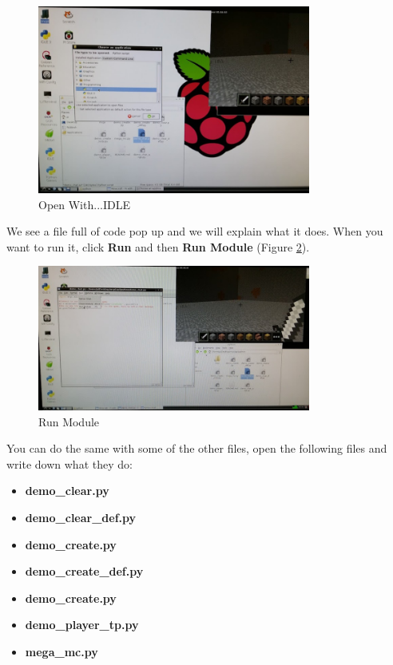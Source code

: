 \documentclass[]{paper}
\begin{document}
\begin{figure}[H]
    \centering
    \includegraphics[width=0.8\textwidth]{figures/idle.jpg}
    \caption{Open With...IDLE}
    \label{fig:idle}
\end{figure}


We see a file full of code pop up and we will explain what it does. When you want to run it, click \textbf{Run} and then \textbf{Run Module} (Figure \ref{fig:run}).

\begin{figure}[H]
    \centering
    \includegraphics[width=0.8\textwidth]{figures/run.jpg}
    \caption{Run Module}
    \label{fig:run}
\end{figure}


You can do the same with some of the other files, open the following files and write down what they do:
\begin{itemize}
	\item \textbf{demo\_clear.py}
	\item \textbf{demo\_clear\_def.py}
	\item \textbf{demo\_create.py}
	\item \textbf{demo\_create\_def.py}
	\item \textbf{demo\_create.py}
	\item \textbf{demo\_player\_tp.py}
	\item \textbf{mega\_mc.py}
\end{itemize}
\end{document}
